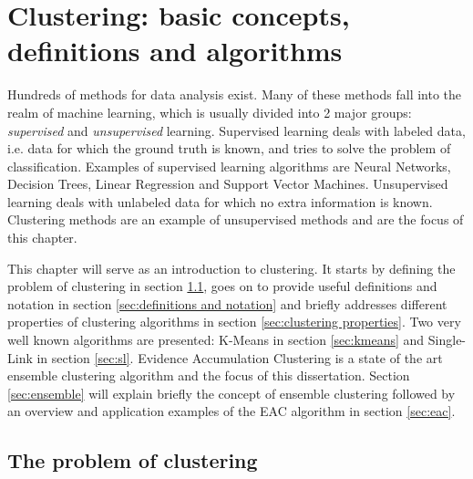 
\chapter{Clustering: basic concepts, definitions and algorithms}
\label{chapter:clustering}

Hundreds of methods for data analysis exist.
Many of these methods fall into the realm of machine learning, which is usually divided into 2 major groups: \textit{supervised} and \textit{unsupervised} learning.
Supervised learning deals with labeled data, i.e. data for which the ground truth is known, and tries to solve the problem of classification.
Examples of supervised learning algorithms are Neural Networks, Decision Trees, Linear Regression and Support Vector Machines. %
Unsupervised learning deals with unlabeled data for which no extra information is known.
Clustering methods are an example of unsupervised methods and are the focus of this chapter.

This chapter will serve as an introduction to clustering.
It starts by defining the problem of clustering in section \ref{sec:clustering}, goes on to provide useful definitions and notation in section \ref{sec:definitions and notation} and briefly addresses different properties of clustering algorithms in section \ref{sec:clustering properties}.
Two very well known algorithms are presented: K-Means in section \ref{sec:kmeans} and Single-Link in section \ref{sec:sl}.
Evidence Accumulation Clustering is a state of the art ensemble clustering algorithm and the focus of this dissertation.
Section \ref{sec:ensemble} will explain briefly the concept of ensemble clustering followed by an overview and application examples of the EAC algorithm in section \ref{sec:eac}.

\section{The problem of clustering}
\label{sec:clustering}


